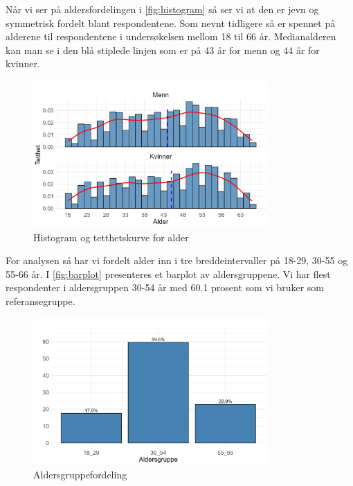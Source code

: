 \documentclass[
  12pt,
  a4paper,
  DIV=11,
  numbers=noendperiod]{scrartcl}
\begin{document}
Når vi ser på aldersfordelingen i \autoref{fig:histogram} så ser vi at
den er jevn og symmetrisk fordelt blant respondentene. Som nevnt
tidligere så er spennet på alderene til respondentene i undersøkelsen
mellom 18 til 66 år. Medianalderen kan man se i den blå stiplede linjen
som er på 43 år for menn og 44 år for kvinner.

\begin{figure}[H]
\caption{Histogram og tetthetskurve for alder}
\label{fig:histogram}
\centering
\includegraphics[width=0.8\textwidth]{dokumentobjekter/figurer/fig_2.png}
\end{figure}

For analysen så har vi fordelt alder inn i tre breddeintervaller på
18-29, 30-55 og 55-66 år. I \autoref{fig:barplot} presenteres et barplot
av aldersgruppene. Vi har flest respondenter i aldersgruppen 30-54 år
med 60.1 prosent som vi bruker som referansegruppe.

\begin{figure}[H]
\caption{Aldersgruppefordeling}
\label{fig:barplot}
\centering
\includegraphics[width=0.8\textwidth]{dokumentobjekter/figurer/fig_3.png}
\end{figure}

\clearpage
\end{document}
